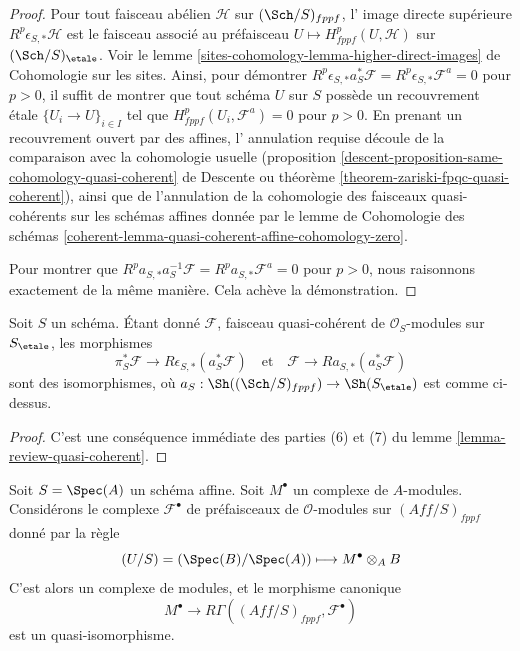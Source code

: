 \begin{proof}
\medskip\noindent
Pour tout faisceau abélien $\mathcal{H}$ sur $(\Sch/S)_{fppf}$, l'
image directe supérieure $R^p\epsilon_{S, *}\mathcal{H}$ est le faisceau
associé au préfaisceau $U \mapsto H^p_{fppf}(U, \mathcal{H})$
sur $(\Sch/S)_\etale$. Voir le
lemme \ref{sites-cohomology-lemma-higher-direct-images} de Cohomologie sur les sites.
Ainsi, pour démontrer
$R^p\epsilon_{S, *}a_S^*\mathcal{F} = R^p\epsilon_{S, *}\mathcal{F}^a = 0$
pour $p > 0$, il suffit de montrer que tout schéma $U$ sur $S$
possède un recouvrement étale $\{U_i \to U\}_{i \in I}$ tel que
$H^p_{fppf}(U_i, \mathcal{F}^a) = 0$ pour $p > 0$.
En prenant un recouvrement ouvert par des affines, l'
annulation requise découle de la comparaison avec la cohomologie usuelle
(proposition \ref{descent-proposition-same-cohomology-quasi-coherent} de Descente
ou
théorème \ref{theorem-zariski-fpqc-quasi-coherent}),
ainsi que de l'annulation de la cohomologie des faisceaux quasi-cohérents
sur les schémas affines donnée par le lemme de Cohomologie des schémas
\ref{coherent-lemma-quasi-coherent-affine-cohomology-zero}.

\medskip\noindent
Pour montrer que $R^pa_{S, *}a_S^{-1}\mathcal{F} = R^pa_{S, *}\mathcal{F}^a = 0$
pour $p > 0$, nous raisonnons exactement de la même manière. Cela achève la démonstration.
\end{proof}

\begin{lemma}
\label{lemma-cohomological-descent-etale-fppf-modules}
Soit $S$ un schéma. Étant donné $\mathcal{F}$, faisceau quasi-cohérent
de $\mathcal{O}_S$-modules sur $S_\etale$, les morphismes
$$
\pi_S^*\mathcal{F} \longrightarrow R\epsilon_{S, *}(a_S^*\mathcal{F})
\quad\text{et}\quad
\mathcal{F} \longrightarrow Ra_{S, *}(a_S^*\mathcal{F})
$$
sont des isomorphismes, où
$a_S : \Sh((\Sch/S)_{fppf}) \to \Sh(S_\etale)$ est comme ci-dessus.
\end{lemma}

\begin{proof}
C'est une conséquence immédiate des
parties (6) et (7) du
lemme \ref{lemma-review-quasi-coherent}.
\end{proof}

\begin{lemma}
\label{lemma-cohomological-descent-complex-modules}
Soit $S = \Spec(A)$ un schéma affine. Soit $M^\bullet$ un complexe
de $A$-modules. Considérons le complexe $\mathcal{F}^\bullet$ de
préfaisceaux de $\mathcal{O}$-modules sur
$(\textit{Aff}/S)_{fppf}$ donné par la règle
$$
(U/S) = (\Spec(B)/\Spec(A)) \longmapsto M^\bullet \otimes_A B
$$
C'est alors un complexe de modules, et le morphisme canonique
$$
M^\bullet \longrightarrow
R\Gamma((\textit{Aff}/S)_{fppf}, \mathcal{F}^\bullet)
$$
est un quasi-isomorphisme.
\end{lemma}

